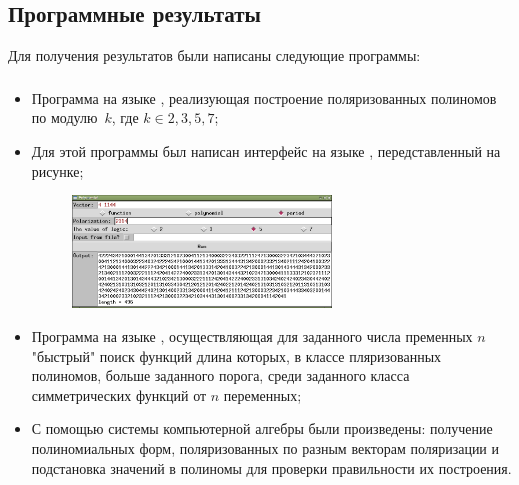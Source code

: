 \documentclass[t]{beamer}
\begin{document}
\subsection{Программные результаты}
\begin{frame}
Для получения результатов были написаны следующие программы:
\frametitle{\insertsection}
\framesubtitle{\insertsubsection}
 {
\begin{itemize}
\item Программа на языке {}, реализующая построение поляризованных полиномов по
    модулю~$k$, где $k \in {2,3,5,7}$;
\item Для этой программы был написан интерфейс на языке {}, передставленный на
    рисунке;
    \begin{figure}[h]
    \centering
    \includegraphics[width=0.65\textwidth]{polyscreen.png}
    \end{figure}
\end{itemize}
}
 {
\begin{itemize}
\item Программа на языке {}, осуществляющая для заданного числа пременных $n$
    "быстрый"{} поиск функций длина которых, в классе пляризованных полиномов, больше заданного
    порога, среди заданного класса симметрических функций от $n$ переменных;
\item С помощью системы компьютерной алгебры  были произведены: получение
    полиномиальных форм, поляризованных по разным векторам поляризации и подстановка значений в
    полиномы для проверки правильности их построения.
\end{itemize}
}
\end{frame}
\end{document}
